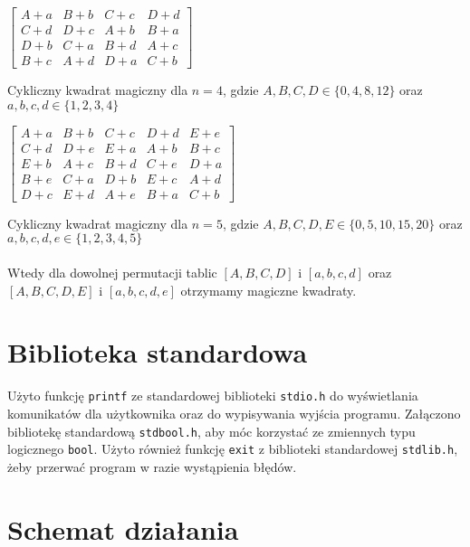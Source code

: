 \documentclass[a4paper, 12pt]{article}
\begin{document}
\begin{center}
	$\begin{bmatrix}
	A+a & B+b & C+c & D+d \\
	C+d & D+c & A+b & B+a \\
	D+b & C+a & B+d & A+c \\
	B+c & A+d & D+a & C+b
	\end{bmatrix}$
\end{center}
Cykliczny kwadrat magiczny dla $n=4$, gdzie $A,B,C,D\in\{0,4,8,12\}$ oraz $a,b,c,d\in\{1,2,3,4\}$
\begin{center}
	$\begin{bmatrix}
	A+a & B+b & C+c & D+d & E+e \\
	C+d & D+e & E+a & A+b & B+c \\
	E+b & A+c & B+d & C+e & D+a \\
	B+e & C+a & D+b & E+c & A+d \\
	D+c & E+d & A+e & B+a & C+b
	\end{bmatrix}$
\end{center}
Cykliczny kwadrat magiczny dla $n=5$, gdzie $A,B,C,D,E\in\{0,5,10,15,20\}$ oraz $a,b,c,d,e\in\{1,2,3,4,5\}$
\\\\
Wtedy dla dowolnej permutacji tablic $[A,B,C,D]$ i $[a,b,c,d]$ oraz $[A,B,C,D,E]$ i $[a,b,c,d,e]$ otrzymamy magiczne kwadraty.

\section*{Biblioteka standardowa}
Użyto funkcję \texttt{printf} ze standardowej biblioteki \texttt{stdio.h} do wyświetlania komunikatów dla użytkownika oraz do wypisywania wyjścia programu. Załączono bibliotekę standardową \texttt{stdbool.h}, aby móc korzystać ze zmiennych typu logicznego \texttt{bool}. Użyto również funkcję \texttt{exit} z biblioteki standardowej \texttt{stdlib.h}, żeby przerwać program w razie wystąpienia błędów.

\section*{Schemat działania}
\begin{center}
\end{center}
\end{document}
